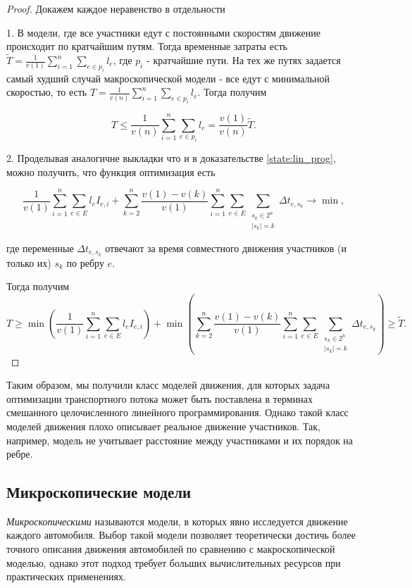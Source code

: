 \documentclass[12pt, a4paper]{article}
\DeclareMathOperator*{\minn}{min}
\begin{document}
\begin{proof}
	Докажем каждое неравенство в отдельности
	
	1. В модели, где все участники едут с постоянными скоростям движение происходит по кратчайшим путям. Тогда временные затраты есть $\widetilde{T} = \frac{1}{v(1)} \sum \limits _{i = 1} ^ n \sum\limits_{e \in p_i} l_e$, где $p_i$ - кратчайшие пути.
	На тех же путях задается самый худший случай макроскопической модели - все едут с минимальной скоростью, то есть $ T = \frac{1}{v(n)} \sum \limits _{i = 1} ^ n \sum\limits_{e \in p_i} l_e$. Тогда получим
	
	$$T \le  \frac{1}{v(n)} \sum \limits _{i = 1} ^ n \sum\limits_{e \in p_i} l_e = \frac {v(1)}{v(n)} \widetilde{T}.$$
	
	2. Проделывая аналогичне выкладки что и в доказательстве \ref{state:lin_prog}, можно получить, что функция оптимизация есть 
	
	$$ \frac{1}{v (1)} \sum\limits_{i = 1}^n \sum \limits _{e \in E} l_e I_{e, i} +  \sum\limits_{k = 2}^{n} \frac{v(1) - v(k)}{v (1)}  \sum\limits_{i = 1}^n \sum \limits _{e \in E} \sum\limits _{\substack{ s_k \in 2^n \\ |s_k| = k}}  \Delta t_{e, s_k} \rightarrow \minn ,$$
	
	где переменные $\Delta t_{e, s_k}$ отвечают за время совместного движения участников (и только их) $s_k$ по ребру $e$.
	
	Тогда получим
		$$T \ge 
		  \minn \left(  \frac{1}{v (1)} \sum\limits_{i = 1}^n \sum \limits _{e \in E} l_e I_{e, i} \right) 
		+ \minn \left(  \sum\limits_{k = 2}^{n} \frac{v(1) - v(k)}{v (1)}  \sum\limits_{i = 1}^n \sum \limits _{e \in E} \sum\limits _{\substack{ s_k \in 2^n \\ |s_k| = k}}  \Delta t_{e, s_k} \right) \ge \widetilde{T}.$$

\end{proof}

Таким образом, мы получили класс моделей движения, для которых задача оптимизации транспортного потока может быть поставлена в терминах смешанного целочисленного линейного программирования. Однако такой класс моделей движения плохо описывает реальное движение участников. Так, например, модель не учитывает расстояние между участниками и их порядок на ребре.

\subsection{Микроскопические модели}
\textit {Микроскопическими} называются модели, в которых явно исследуется движение каждого автомобиля.
Выбор такой модели позволяет теоретически достичь более точного описания движения автомобилей по сравнению с макроскопической моделью, однако этот подход требует больших вычислительных ресурсов при практических применениях.
\end{document}
